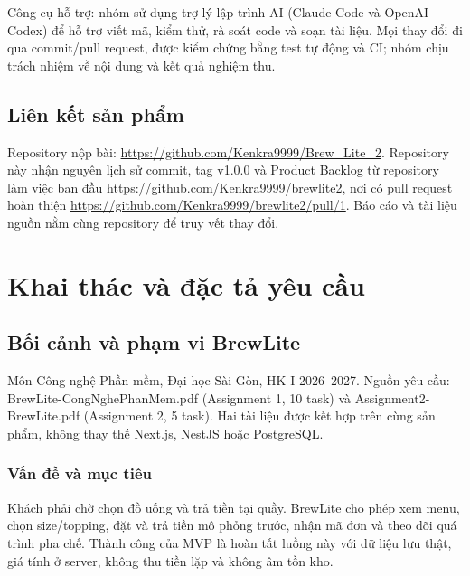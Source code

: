 \documentclass[a4paper,12pt,oneside]{report}
\begin{document}
Công cụ hỗ trợ: nhóm sử dụng trợ lý lập trình AI (Claude Code và OpenAI Codex) để hỗ trợ viết mã, kiểm thử, rà soát code và soạn tài liệu. Mọi thay đổi đi qua commit/pull request, được kiểm chứng bằng test tự động và CI; nhóm chịu trách nhiệm về nội dung và kết quả nghiệm thu.

\section{Liên kết sản phẩm}
Repository nộp bài: \url{https://github.com/Kenkra9999/Brew_Lite_2}. Repository này nhận nguyên lịch sử commit, tag v1.0.0 và Product Backlog từ repository làm việc ban đầu \url{https://github.com/Kenkra9999/brewlite2}, nơi có pull request hoàn thiện \url{https://github.com/Kenkra9999/brewlite2/pull/1}. Báo cáo và tài liệu nguồn nằm cùng repository để truy vết thay đổi.


\chapter{Khai thác và đặc tả yêu cầu}

\section{Bối cảnh và phạm vi BrewLite}

Môn Công nghệ Phần mềm, Đại học Sài Gòn, HK I 2026–2027. Nguồn yêu cầu: {\small\ttfamily BrewLite-\allowbreak{}CongNghePhanMem.\allowbreak{}pdf} (Assignment 1, 10 task) và {\small\ttfamily Assignment2-\allowbreak{}BrewLite.\allowbreak{}pdf} (Assignment 2, 5 task). Hai tài liệu được kết hợp trên cùng sản phẩm, không thay thế Next.js, NestJS hoặc PostgreSQL.


\subsection{Vấn đề và mục tiêu}
Khách phải chờ chọn đồ uống và trả tiền tại quầy. BrewLite cho phép xem menu, chọn size/\allowbreak{}topping, đặt và trả tiền mô phỏng trước, nhận mã đơn và theo dõi quá trình pha chế. Thành công của MVP là hoàn tất luồng này với dữ liệu lưu thật, giá tính ở server, không thu tiền lặp và không âm tồn kho.
\end{document}
